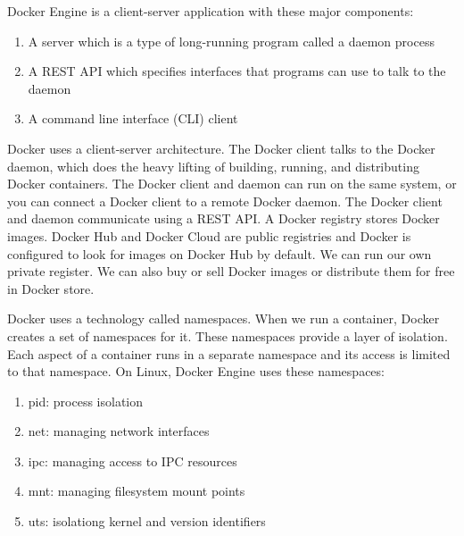 \begin{enumerate}
Docker Engine is a client-server application with these major components:
\begin{enumerate}
\item A server which is a type of long-running program called a daemon process
\item A REST API which specifies interfaces that programs can use to talk to the daemon
\item A command line interface (CLI) client
\end{enumerate}
Docker uses a client-server architecture. The Docker client talks to the Docker daemon, which does the heavy lifting of building, running, and distributing Docker containers. The Docker client and daemon can run on the same system, or you can connect a Docker client to a remote Docker daemon. The Docker client and daemon communicate using a REST API.
A Docker registry stores Docker images. Docker Hub and Docker Cloud are public registries and Docker is configured to look for images on Docker Hub by default. We can run our own private register. We can also buy or sell Docker images or distribute them for free in Docker store.

Docker uses a technology called namespaces. When we run a container, Docker creates a set of namespaces for it. These namespaces provide a layer of isolation. Each aspect of a container runs in a separate namespace and its access is limited to that namespace.
On Linux, Docker Engine uses these namespaces:
\begin{enumerate}
\item pid: process isolation
\item net: managing network interfaces
\item ipc: managing access to IPC resources
\item mnt: managing filesystem mount points
\item uts: isolationg kernel and version identifiers
\end{enumerate}



\end{enumerate}
